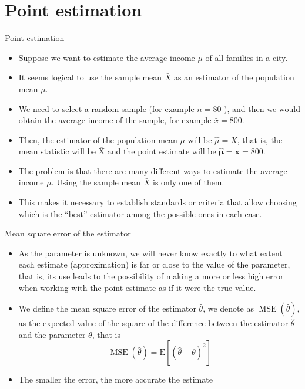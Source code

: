 \documentclass[aspectratio=169]{beamer}
\begin{document}
\section{Point estimation}
\begin{frame}{Point estimation}
	
	
	\begin{itemize}
	\item Suppose we want to estimate the average income $\mu$ of all families in a city. 
 
 \item It seems logical to use the sample mean $\bar{X}$ as an estimator of the population mean $\mu$. 
 
 \item We need to select a random sample (for example $n=80$ ), and then we would obtain the average income of the sample, for example $\bar{x}=800$.

\item Then, the estimator of the population mean $\mu$ will be $\widehat{\mu}=\bar{X}$, that is, the mean statistic will be $\overline{\mathrm{X}}$ and the point estimate will be $\widehat{\boldsymbol{\mu}}=\overline{\boldsymbol{x}}=800$.

\item The problem is that there are many different ways to estimate the average income $\mu$. Using the sample mean $\bar X$ is only one of them. 
 
\item This makes it necessary to establish standards or criteria that allow choosing which is the ``best'' estimator among the possible ones in each case.
 
	\end{itemize}	
	
\end{frame}
\begin{frame}{Mean square error of the estimator}
	
	
	\begin{itemize}
	\item As the parameter is unknown, we will never know exactly to what extent each estimate (approximation) is far or close to the value of the parameter, that is, its use leads to the possibility of making a more or less high error when working with the point estimate as if it were the true value.

 \item We define the mean square error of the estimator $\hat{\theta}$, we denote as $\operatorname{MSE}(\hat{\theta})$, as the expected value of the square of the difference between the estimator $\hat{\theta}$ and the parameter $\theta$, that is
$$
\operatorname{MSE}(\hat{\theta})=\mathrm{E}\left[(\hat{\theta}-\theta)^2\right]
$$

\item The
smaller the error, the more accurate the estimate

 
	\end{itemize}	
	
\end{frame}
\end{document}
